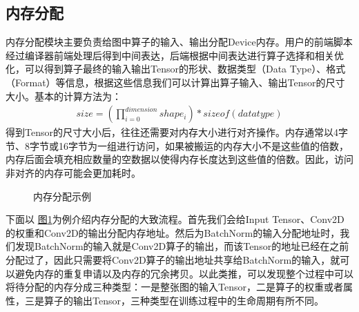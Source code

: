 \documentclass[letterpaper,10pt,english]{sphinxmanual}
\let\sphinxpxdimen\pdfpxdimen\else\newdimen\sphinxpxdimen
\begin{document}
\subsection{内存分配}
\label{\detokenize{chapter_backend_and_runtime/memory_allocator:id3}}
\sphinxAtStartPar
内存分配模块主要负责给图中算子的输入、输出分配Device内存。用户的前端脚本经过编译器前端处理后得到中间表达，后端根据中间表达进行算子选择和相关优化，可以得到算子最终的输入输出Tensor的形状、数据类型（Data
Type）、格式（Format）等信息，根据这些信息我们可以计算出算子输入、输出Tensor的尺寸大小。基本的计算方法为：
\begin{equation}\label{equation:chapter_backend_and_runtime/memory_allocator:chapter_backend_and_runtime/memory_allocator:0}
\begin{split}size=\left (\prod_{i=0}^{dimension}shape_i\right ) * sizeof\left ( data type \right )\end{split}
\end{equation}
\sphinxAtStartPar
得到Tensor的尺寸大小后，往往还需要对内存大小进行对齐操作。内存通常以4字节、8字节或16字节为一组进行访问，如果被搬运的内存大小不是这些值的倍数，内存后面会填充相应数量的空数据以使得内存长度达到这些值的倍数。因此，访问非对齐的内存可能会更加耗时。

\begin{figure}[H]
\centering
\capstart

\noindent\sphinxincludegraphics[width=800\sphinxpxdimen]{{memory_allocate}.png}
\caption{内存分配示例}\label{\detokenize{chapter_backend_and_runtime/memory_allocator:id8}}\label{\detokenize{chapter_backend_and_runtime/memory_allocator:memory-allocate}}\end{figure}

\sphinxAtStartPar
下面以
\hyperref[\detokenize{chapter_backend_and_runtime/memory_allocator:memory-allocate}]{图\ref{\detokenize{chapter_backend_and_runtime/memory_allocator:memory-allocate}}}为例介绍内存分配的大致流程。首先我们会给Input
Tensor、Conv2D的权重和Conv2D的输出分配内存地址。然后为BatchNorm的输入分配地址时，我们发现BatchNorm的输入就是Conv2D算子的输出，而该Tensor的地址已经在之前分配过了，因此只需要将Conv2D算子的输出地址共享给BatchNorm的输入，就可以避免内存的重复申请以及内存的冗余拷贝。以此类推，可以发现整个过程中可以将待分配的内存分成三种类型：一是整张图的输入Tensor，二是算子的权重或者属性，三是算子的输出Tensor，三种类型在训练过程中的生命周期有所不同。
\end{document}
